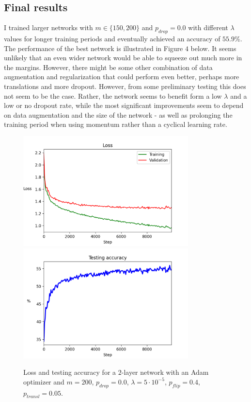 \documentclass{article}
\begin{document}
\subsection*{Final results}
	I trained larger networks with $m\in\{150, 200\}$ and $p_{drop} = 0.0$ with different $\lambda$ values for longer training periods and eventually achieved an accuracy of $\bm{55.9}$\%. The performance of the best network is illustrated in Figure $4$ below. It seems unlikely that an even wider network would be able to squeeze out much more in the margins. However, there might be some other combination of data augmentation and regularization that could perform even better, perhaps more translations and more dropout. However, from some preliminary testing this does not seem to be the case. Rather, the network seems to benefit form a low $\lambda$ and a low or no dropout rate, while the most significant improvements seem to depend on data augmentation and the size of the network - as well as prolonging the training period when using momentum rather than a cyclical learning rate.
	\begin{figure}[!h]
		\centering
		\includegraphics[width=9cm]{../plots/loss_top_v3.png}
		\includegraphics[width=9cm]{../plots/acc_top_v3.png}
		\caption{Loss and testing accuracy for a $2$-layer network with an Adam optimizer and $m = 200$, $p_{drop} = 0.0$, $\lambda = 5\cdot10^{-5}$, $p_{flip}=0.4$, $p_{transl}=0.05$.}
	\end{figure}
	
\end{document}
